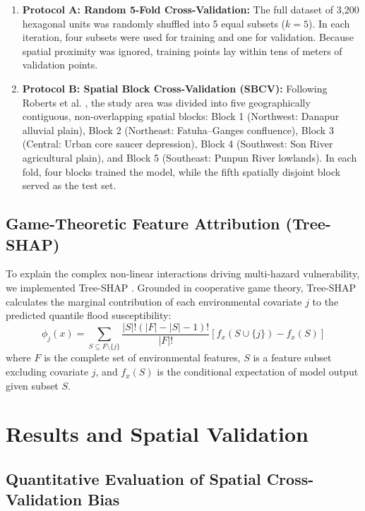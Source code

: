 \documentclass[OA,linenum]{InterPore}
\begin{document}
\begin{enumerate}
    \item \textbf{Protocol A: Random 5-Fold Cross-Validation:} The full dataset of 3,200 hexagonal units was randomly shuffled into 5 equal subsets ($k=5$). In each iteration, four subsets were used for training and one for validation. Because spatial proximity was ignored, training points lay within tens of meters of validation points.
    \item \textbf{Protocol B: Spatial Block Cross-Validation (SBCV):} Following Roberts et al. \cite{Roberts2016}, the study area was divided into five geographically contiguous, non-overlapping spatial blocks: Block 1 (Northwest: Danapur alluvial plain), Block 2 (Northeast: Fatuha--Ganges confluence), Block 3 (Central: Urban core saucer depression), Block 4 (Southwest: Son River agricultural plain), and Block 5 (Southeast: Punpun River lowlands). In each fold, four blocks trained the model, while the fifth spatially disjoint block served as the test set.
\end{enumerate}

\subsection{Game-Theoretic Feature Attribution (Tree-SHAP)}

To explain the complex non-linear interactions driving multi-hazard vulnerability, we implemented Tree-SHAP \cite{Lundberg2017}. Grounded in cooperative game theory, Tree-SHAP calculates the marginal contribution of each environmental covariate $j$ to the predicted quantile flood susceptibility:
\begin{equation}
    \phi_j(x) = \sum_{S \subseteq F \setminus \{j\}} \frac{|S|! (|F| - |S| - 1)!}{|F|!} \left[ f_x(S \cup \{j\}) - f_x(S) \right]
\end{equation}
where $F$ is the complete set of environmental features, $S$ is a feature subset excluding covariate $j$, and $f_x(S)$ is the conditional expectation of model output given subset $S$.

\section{Results and Spatial Validation}

\subsection{Quantitative Evaluation of Spatial Cross-Validation Bias}
\end{document}
